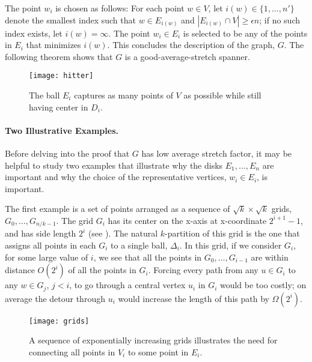 \documentclass{patmorin}
\begin{document}
The point $w_i$ is chosen as follows: For each point $w\in V$, let
$i(w)\in \{1,\ldots,n'\}$ denote the smallest index such that $w\in
E_{i(w)}$ and $|E_{i(w)}\cap V| \ge \epsilon n$; if no such index
exists, let $i(w)=\infty$.  The point $w_i\in E_i$ is selected to be
any of the points in $E_i$ that minimizes $i(w)$.  This concludes the
description of the graph, $G$.  The following theorem shows that $G$
is a good-average-stretch spanner.


\begin{figure}
  \begin{center}
    \texttt{[image: hitter]}
  \end{center}
  \caption{The ball $E_i$ captures as many points of $V$ as possible
   while still having center in $D_i$.}
\end{figure}

\paragraph{Two Illustrative Examples.}

Before delving into the proof that $G$ has low average stretch factor,
it may be helpful to study two examples that illustrate why the disks
$E_1,\ldots,E_n$ are important and why the choice of the representative
vertices, $w_i\in E_i$, is  important.

The first example is a set of points arranged as a sequence of
$\sqrt{k}\times\sqrt{k}$ grids, $G_0,\ldots,G_{n/k-1}$.  The grid $G_i$
has its center on the x-axis at x-coordinate $2^{i+1}-1$, and has side
length $2^i$ (see ). The natural $k$-partition of this
grid is the one that assigns all points in each $G_i$ to a single ball,
$\Delta_i$.  In this grid, if we consider $G_i$, for some large value
of $i$, we see that all the points in $G_0,\ldots,G_{i-1}$ are within
distance $O(2^{i})$ of all the points in $G_i$.
Forcing every path from any $u\in G_i$ to any $w\in G_{j}$, $j<i$,
to go through a central vertex $u_i$ in $G_i$ would be too costly; on
average the detour through $u_i$ would increase the length of this path
by $\Omega(2^{i})$.

\begin{figure}
  \begin{center}
    \texttt{[image: grids]}
  \end{center}
  \caption{A sequence of exponentially increasing grids illustrates the
   need for connecting all points in $V_i$ to some point in $E_i$.}
\end{figure}
\end{document}
